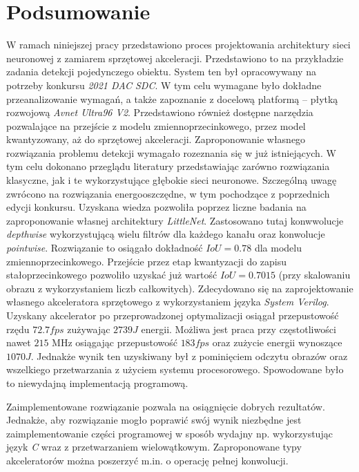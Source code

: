 \chapter{Podsumowanie}
\label{cha:Podsumowanie}


W ramach niniejszej pracy przedstawiono proces projektowania architektury sieci neuronowej z zamiarem sprzętowej akceleracji. 
Przedstawiono to na przykładzie zadania detekcji pojedynczego obiektu. 
System ten był opracowywany na potrzeby konkursu \emph{2021 DAC SDC}. 
W tym celu wymagane było dokładne przeanalizowanie wymagań, a także zapoznanie z docelową platformą -- płytką rozwojową \emph{Avnet Ultra96 V2}. 
Przedstawiono również dostępne narzędzia pozwalające na przejście z modelu zmiennoprzecinkowego, przez model kwantyzowany, aż do sprzętowej akceleracji.
Zaproponowanie własnego rozwiązania problemu detekcji wymagało rozeznania się w już istniejących. 
W tym celu dokonano przeglądu literatury przedstawiając zarówno rozwiązania klasyczne, jak i te wykorzystujące głębokie sieci neuronowe. 
Szczególną uwagę zwrócono na rozwiązania energooszczędne, w tym pochodzące z poprzednich edycji konkursu.
Uzyskana wiedza pozwoliła poprzez liczne badania na zaproponowanie własnej architektury \emph{LittleNet}. 
Zastosowano tutaj konwwolucje \emph{depthwise} wykorzystującą wielu filtrów dla każdego kanału oraz konwolucje \emph{pointwise}.
Rozwiązanie to osiągało dokładność $IoU = 0.78$ dla modelu zmiennoprzecinkowego.
Przejście przez etap kwantyzacji do zapisu stałoprzecinkowego pozwoliło uzyskać już wartość $IoU = 0.7015$ (przy skalowaniu obrazu z wykorzystaniem liczb całkowitych). 
Zdecydowano się na zaprojektowanie własnego akceleratora sprzętowego z wykorzystaniem języka \emph{System Verilog}. 
Uzyskany akcelerator po przeprowadzonej optymalizacji osiągał przepustowość rzędu $72.7 fps$ zużywając $2739 J$ energii.
Możliwa jest praca przy częstotliwości nawet $215$ MHz osiągając przepustowość $183 fps$ oraz zużycie energii wynoszące $1070 J$. 
Jednakże wynik ten uzyskiwany był z pominięciem odczytu obrazów oraz wszelkiego przetwarzania z użyciem systemu procesorowego.
Spowodowane było to niewydajną implementacją programową.

Zaimplementowane rozwiązanie pozwala na osiągnięcie dobrych rezultatów. 
Jednakże, aby rozwiązanie mogło poprawić swój wynik niezbędne jest zaimplementowanie części programowej w sposób wydajny np. wykorzystując język \emph{C} wraz z przetwarzaniem wielowątkowym.
Zaproponowane typy akceleratorów można poszerzyć m.in. o operację pełnej konwolucji.
